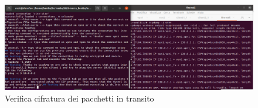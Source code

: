 \begin{figure}[H] 
    \centering
    \includegraphics[width=1\textwidth]{(4)Encryptedpacket_output.png} 
    \caption{Verifica cifratura dei pacchetti in transito}
    \label{fig:Verifica4}
\end{figure}


